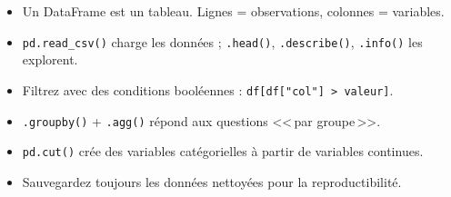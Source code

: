 \begin{itemize}
  \item Un DataFrame est un tableau. Lignes = observations, colonnes = variables.
  \item \texttt{pd.read\_csv()} charge les donn\'ees ; \texttt{.head()}, \texttt{.describe()}, \texttt{.info()} les explorent.
  \item Filtrez avec des conditions bool\'eennes : \texttt{df[df["col"] > valeur]}.
  \item \texttt{.groupby()} + \texttt{.agg()} r\'epond aux questions <<\,par groupe\,>>.
  \item \texttt{pd.cut()} cr\'ee des variables cat\'egorielles \`a partir de variables continues.
  \item Sauvegardez toujours les donn\'ees nettoy\'ees pour la reproductibilit\'e.
\end{itemize}
